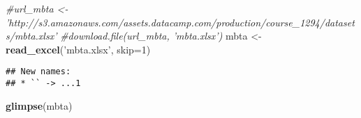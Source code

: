 \documentclass[]{article}
\newenvironment{Shaded}{\begin{snugshade}}{\end{snugshade}}
\newcommand{\CommentTok}[1]{\textcolor[rgb]{0.56,0.35,0.01}{\textit{#1}}}
\newcommand{\DataTypeTok}[1]{\textcolor[rgb]{0.13,0.29,0.53}{#1}}
\newcommand{\DecValTok}[1]{\textcolor[rgb]{0.00,0.00,0.81}{#1}}
\newcommand{\KeywordTok}[1]{\textcolor[rgb]{0.13,0.29,0.53}{\textbf{#1}}}
\newcommand{\NormalTok}[1]{#1}
\newcommand{\StringTok}[1]{\textcolor[rgb]{0.31,0.60,0.02}{#1}}
\begin{document}
\begin{Shaded}
\begin{Highlighting}[]
\CommentTok{#url_mbta <- 'http://s3.amazonaws.com/assets.datacamp.com/production/course_1294/datasets/mbta.xlsx'}
\CommentTok{#download.file(url_mbta, 'mbta.xlsx')}
\NormalTok{mbta <-}\StringTok{ }\KeywordTok{read_excel}\NormalTok{(}\StringTok{'mbta.xlsx'}\NormalTok{, }\DataTypeTok{skip=}\DecValTok{1}\NormalTok{)}
\end{Highlighting}
\end{Shaded}

\begin{verbatim}
## New names:
## * `` -> ...1
\end{verbatim}

\begin{Shaded}
\begin{Highlighting}[]
\KeywordTok{glimpse}\NormalTok{(mbta)}
\end{Highlighting}
\end{Shaded}
\end{document}
